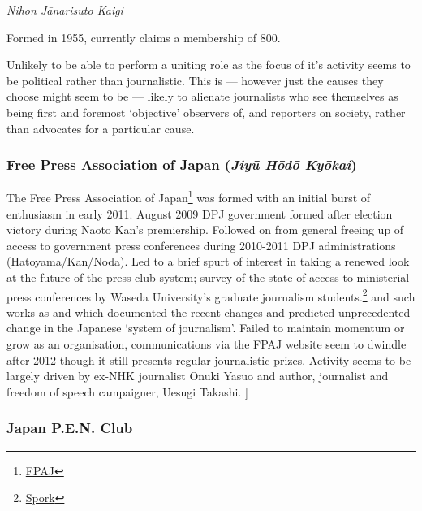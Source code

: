 \documentclass[11pt, headings=normal]{scrartcl}
\begin{document}
\emph{Nihon Jānarisuto Kaigi}

Formed in 1955, currently claims a membership of 800.

Unlikely to be able to perform a uniting role as the focus of it's
activity seems to be political rather than journalistic. This is ---
however just the causes they choose might seem to be --- likely to
alienate journalists who see themselves as being first and foremost
`objective' observers of, and reporters on society, rather than
advocates for a particular cause.

\hypertarget{free-press-association-of-japan-jiyux16b-hux14ddux14d-kyux14dkai}{%
\subsubsection*{\texorpdfstring{Free Press Association of Japan
(\emph{Jiyū Hōdō
Kyōkai})}{Free Press Association of Japan (Jiyū Hōdō Kyōkai)}}\label{free-press-association-of-japan-jiyux16b-hux14ddux14d-kyux14dkai}}

The Free Press Association of Japan\footnote{\href{http://fpaj.jp}{FPAJ}}
was formed with an initial burst of enthusiasm in early 2011. August
2009 DPJ government formed after election victory during Naoto Kan's
premiership. Followed on from general freeing up of access to government
press conferences during 2010-2011 DPJ administrations
(Hatoyama/Kan/Noda). Led to a brief spurt of interest in taking a
renewed look at the future of the press club system; survey of the state
of access to ministerial press conferences by Waseda University's
graduate journalism students.\footnote{\href{http://spork.jp/?p=746}{Spork}}
and such works as \textcite{Asano:2011} and \textcite{Uesugi:2010} which
documented the recent changes and predicted unprecedented change in the
Japanese `system of journalism'. Failed to maintain momentum or grow as
an organisation, communications via the FPAJ website seem to dwindle
after 2012 though it still presents regular journalistic prizes.
Activity seems to be largely driven by ex-NHK journalist Onuki Yasuo and
author, journalist and freedom of speech campaigner, Uesugi Takashi. {]}

\hypertarget{japan-p.e.n.-club}{%
\subsubsection*{Japan P.E.N. Club}\label{japan-p.e.n.-club}}
\end{document}
